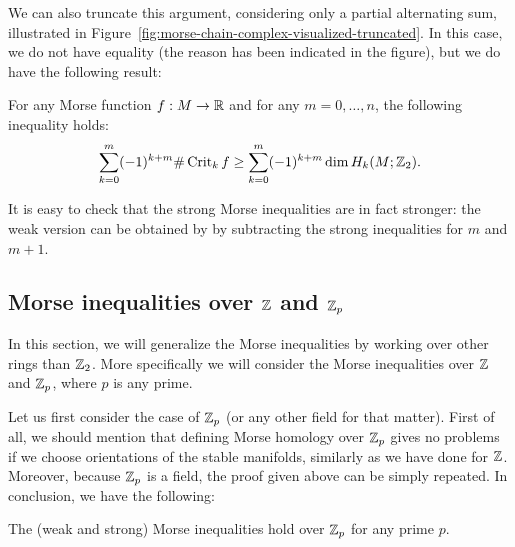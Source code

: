     We can also truncate this argument, considering only a partial alternating sum, illustrated in Figure~\ref{fig:morse-chain-complex-visualized-truncated}.
    In this case, we do not have equality (the reason has been indicated in the figure), but we do have the following result:
\begin{theorem}
    For any Morse function $f: M \to  \mathbb{R}$ and for any $m = 0, \ldots, n$, the following inequality holds:
    \[
        \sum_{k=0}^{m} (-1)^{k+m} \# \operatorname{Crit}_k f \ge  \sum_{k=0}^{m} (-1)^{k+m} \dim H_k(M; \mathbb{Z}_2)
    .\]
\end{theorem}

It is easy to check that the strong Morse inequalities are in fact stronger: the weak version can be obtained by by subtracting the strong inequalities for $m$ and  $m+1$.

\subsection{Morse inequalities over $\mathbb{Z}$ and $\mathbb{Z}_p$}

In this section, we will generalize the Morse inequalities by working over other rings than $\mathbb{Z}_2$. More specifically we will consider the Morse inequalities over $\mathbb{Z}$ and $\mathbb{Z}_p$, where $p$ is any prime.


Let us first consider the case of $\mathbb{Z}_p$ (or any other field for that matter).
First of all,
we should mention that defining Morse homology over $\mathbb{Z}_p$ gives no problems if we choose orientations of the stable manifolds, similarly as we have done for $\mathbb{Z}$. Moreover,
because $\mathbb{Z}_p$ is a field,
the proof given above can be simply repeated. In conclusion, we have the following:

\begin{theorem}
    The (weak and strong) Morse inequalities hold over $\mathbb{Z}_p$ for any prime $p$.
\end{theorem}

